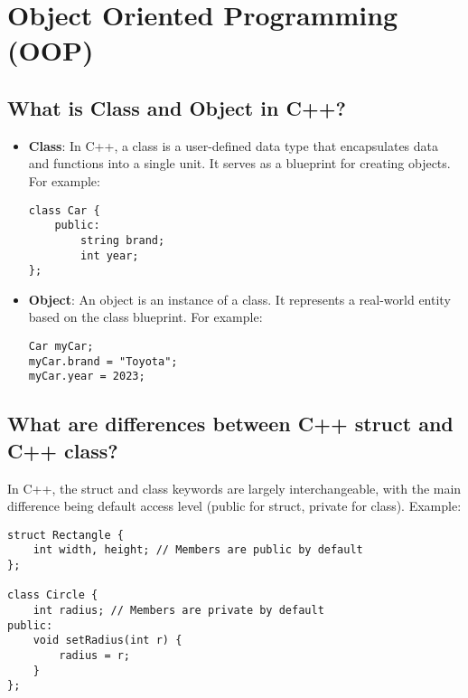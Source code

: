 \section{Object Oriented Programming (OOP)}

\subsection{What is Class and Object in C++?}
\begin{itemize}
\item \textbf{Class}: In C++, a class is a user-defined data type that encapsulates data and functions into a single unit. It serves as a blueprint for creating objects. For example:
\begin{tcolorbox}[title=Class]
\begin{verbatim}
class Car {
    public:
        string brand;
        int year;
};
\end{verbatim}
\end{tcolorbox}
\item \textbf{Object}: An object is an instance of a class. It represents a real-world entity based on the class blueprint. For example:
\begin{tcolorbox}[title=Object]
\begin{verbatim}
Car myCar;
myCar.brand = "Toyota";
myCar.year = 2023;
\end{verbatim}
\end{tcolorbox}
\end{itemize}

\subsection{What are differences between C++ struct and C++ class?}
In C++, the struct and class keywords are largely interchangeable, with the main difference being default access level (public for struct, private for class). Example:
\begin{tcolorbox}[title=Struct vs Class]
\begin{verbatim}
struct Rectangle {
    int width, height; // Members are public by default
};

class Circle {
    int radius; // Members are private by default
public:
    void setRadius(int r) {
        radius = r;
    }
};
\end{verbatim}
\end{tcolorbox}


